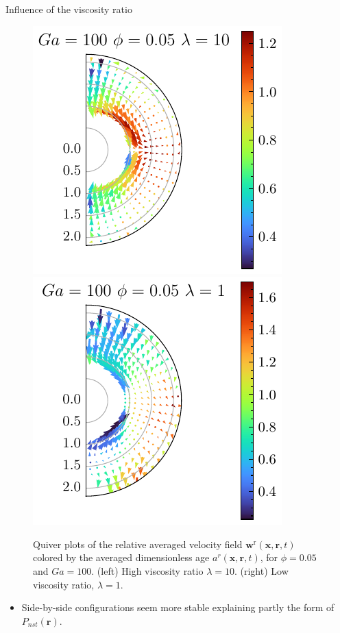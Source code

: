 \documentclass{sintefbeamer}
\begin{document}
\begin{frame}
  {Influence of the viscosity ratio}

  \begin{figure}[h!]
      \centering
      \includegraphics[height=0.35\textwidth]{image/HOMOGENEOUS_NEW/Dist/U_rel_l_10_Ga_100_PHI_5.pdf}
      \includegraphics[height=0.35\textwidth]{image/HOMOGENEOUS_NEW/Dist/U_rel_l_1_Ga_100_PHI_5.pdf}
      \caption{Quiver plots of the relative averaged velocity field $\textbf{w}^\text{r}(\textbf{x},\textbf{r},t)$ colored by the averaged dimensionless age $a^r(\textbf{x},\textbf{r},t)$, for $\phi = 0.05$ and $Ga = 100$. 
      (left) High viscosity ratio $\lambda = 10$.
      (right) Low viscosity ratio, $\lambda = 1$. }
      \label{fig:Why_l_matter}
  \end{figure}

  \begin{itemize}
    \item Side-by-side configurations seem more stable explaining partly the form of $P_{nst}(\textbf{r})$. 
  \end{itemize}
\end{frame}
\end{document}
